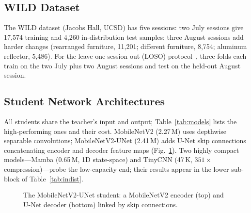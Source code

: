 \documentclass[conference,a4paper]{IEEEtran}
\begin{document}
\subsection{WILD Dataset}
The WILD dataset (Jacobs Hall, UCSD) has five sessions: two July sessions give 17{,}574 training and 4{,}260 in-distribution test samples; three August sessions add harder changes (rearranged furniture, 11{,}201; different furniture, 8{,}754; aluminum reflector, 5{,}486). For the leave-one-session-out (LOSO) protocol~\cite{ayyalasomayajula2020deep}, three folds each train on the two July plus two August sessions and test on the held-out August session.

\subsection{Student Network Architectures}
All students share the teacher's input and output; Table~\ref{tab:models} lists the high-performing ones and their cost. MobileNetV2 (2.27\,M) uses depthwise separable convolutions; MobileNetV2-UNet (2.41\,M) adds U-Net skip connections concatenating encoder and decoder feature maps (Fig.~\ref{fig:unet}). Two highly compact models---Mamba (0.65\,M, 1D state-space) and TinyCNN (47\,K, $351\times$ compression)---probe the low-capacity end; their results appear in the lower sub-block of Table~\ref{tab:indist}.

\begin{table}[t]
\caption{High-Performing Models and Their Computational Cost (Batch Size 1; DLoc = Test-Time Path: Encoder + Location Decoder).}
\label{tab:models}
\centering
\scriptsize
\setlength{\tabcolsep}{4pt}
\end{table}

\begin{figure}[t]
\centering
\resizebox{\columnwidth}{!}{}
\caption{The MobileNetV2-UNet student: a MobileNetV2 encoder (top) and U-Net decoder (bottom) linked by skip connections.}
\label{fig:unet}
\end{figure}
\end{document}
